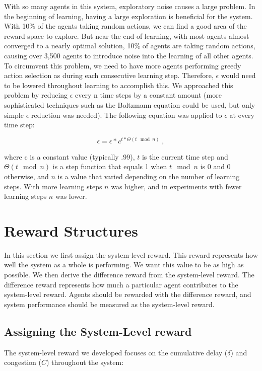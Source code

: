\documentclass[onehalf,11pt]{beavtex}
\begin{document}
With so many agents in this system, exploratory noise causes a large problem. In the beginning of learning, having a large exploration is beneficial for the system. With 10\% of the agents taking random actions, we can find a good area of the reward space to explore. But near the end of learning, with most agents almost converged to a nearly optimal solution, 10\% of agents are taking random actions, causing over 3,500 agents to introduce noise into the learning of all other agents. To circumvent this problem, we need to have more agents performing greedy action selection as during each consecutive learning step. Therefore, $\epsilon$ would need to be lowered throughout learning to accomplish this. We approached this problem by reducing $\epsilon$ every n time steps by a constant amount (more sophisticated techniques such as the Boltzmann equation could be used, but only simple $\epsilon$ reduction was needed). The following equation was applied to $\epsilon$ at every time step:

\begin{equation}
\epsilon = \epsilon * c^{t * \Theta(t \mod n)}\;,
\end{equation}
 
where c is a constant value (typically .99), $t$ is the current time step and $\Theta(t \mod n)$ is a step function that equals 1 when $t \mod n$ is 0 and 0 otherwise, and $n$ is a value that varied depending on the number of learning steps. With more learning steps $n$ was higher, and in experiments with fewer learning steps $n$ was lower.

\section{Reward Structures}

In this section we first assign the system-level reward. This reward represents how well the system as a whole is performing. We want this value to be as high as possible. We then derive the difference reward from the system-level reward. The difference reward represents how much a particular agent contributes to the system-level reward. Agents should be rewarded with the difference reward, and system performance should be measured as the system-level reward. 

\subsection{Assigning the System-Level reward}
The system-level reward we developed focuses on the cumulative delay ($\delta$) and congestion ($C$) throughout the system:
\end{document}
